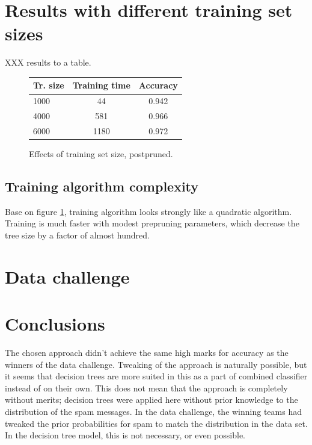 \documentclass[a4paper,10pt]{article}
\begin{document}
\section{Results with different training set sizes}

XXX results to a table.
\begin{figure}
  \centering
\begin{tabular}{|l|c|c|}
\hline
Tr. size & Training time & Accuracy \\ \hline
1000 & 44 & 0.942 \\
4000 & 581 & 0.966 \\
6000 & 1180 & 0.972 \\
\hline
\end{tabular}
  \caption{Effects of training set size, postpruned.}
  \label{fig:training-data-size} 
\end{figure}

\subsection{Training algorithm complexity}

Base on figure \ref{fig:training-data-size}, training algorithm looks
strongly like a quadratic algorithm.  Training is much faster with
modest prepruning parameters, which decrease the tree size by a factor
of almost hundred.

\section{Data challenge}



\section{Conclusions}

The chosen approach didn't achieve the same high marks for accuracy as
the winners of the data challenge.  Tweaking of the approach is
naturally possible, but it seems that decision trees are more suited in
this as a part of combined classifier instead of on their own.  This
does not mean that the approach is completely without merits; decision
trees were applied here without prior knowledge to the distribution of
the spam messages.  In the data challenge, the winning teams had tweaked
the prior probabilities for spam to match the distribution in the data
set.  In the decision tree model, this is not necessary, or even
possible.
\end{document}

